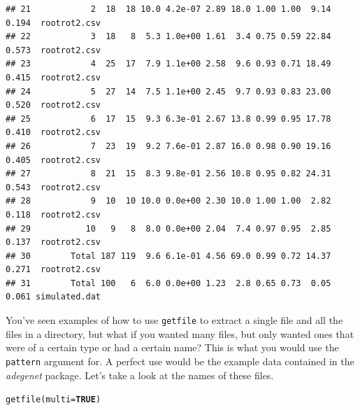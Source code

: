 \documentclass[letterpaper]{article}\usepackage[]{graphicx}\usepackage[]{color}
\makeatletter
\newcommand{\hlnum}[1]{\textcolor[rgb]{0.502,0,0.502}{\textbf{#1}}}%
\newcommand{\hlstd}[1]{\textcolor[rgb]{0,0,0}{#1}}%
\newcommand{\hlkwc}[1]{\textcolor[rgb]{0,0.502,0.753}{#1}}%
\newcommand{\hlkwd}[1]{\textcolor[rgb]{0,0.267,0.4}{#1}}%
\newenvironment{kframe}{%
 \def\at@end@of@kframe{}%
 \ifinner\ifhmode%
  \def\at@end@of@kframe{\end{minipage}}%
  \begin{minipage}{\columnwidth}%
 \fi\fi%
 \def\FrameCommand##1{\hskip\@totalleftmargin \hskip-\fboxsep
 \colorbox{shadecolor}{##1}\hskip-\fboxsep
     \hskip-\linewidth \hskip-\@totalleftmargin \hskip\columnwidth}%
 \MakeFramed {\advance\hsize-\width
   \@totalleftmargin\z@ \linewidth\hsize
   \@setminipage}}%
 {\par\unskip\endMakeFramed%
 \at@end@of@kframe}
\newenvironment{knitrout}{}{} %
\newcommand{\adegenet}{\textit{adegenet}}
\makeatother
\begin{document}
\begin{knitrout}
\begin{kframe}
\begin{verbatim}
## 21            2  18  18 10.0 4.2e-07 2.89 18.0 1.00 1.00  9.14 0.194  rootrot2.csv
## 22            3  18   8  5.3 1.0e+00 1.61  3.4 0.75 0.59 22.84 0.573  rootrot2.csv
## 23            4  25  17  7.9 1.1e+00 2.58  9.6 0.93 0.71 18.49 0.415  rootrot2.csv
## 24            5  27  14  7.5 1.1e+00 2.45  9.7 0.93 0.83 23.00 0.520  rootrot2.csv
## 25            6  17  15  9.3 6.3e-01 2.67 13.8 0.99 0.95 17.78 0.410  rootrot2.csv
## 26            7  23  19  9.2 7.6e-01 2.87 16.0 0.98 0.90 19.16 0.405  rootrot2.csv
## 27            8  21  15  8.3 9.8e-01 2.56 10.8 0.95 0.82 24.31 0.543  rootrot2.csv
## 28            9  10  10 10.0 0.0e+00 2.30 10.0 1.00 1.00  2.82 0.118  rootrot2.csv
## 29           10   9   8  8.0 0.0e+00 2.04  7.4 0.97 0.95  2.85 0.137  rootrot2.csv
## 30        Total 187 119  9.6 6.1e-01 4.56 69.0 0.99 0.72 14.37 0.271  rootrot2.csv
## 31        Total 100   6  6.0 0.0e+00 1.23  2.8 0.65 0.73  0.05 0.061 simulated.dat
\end{verbatim}
\end{kframe}
\end{knitrout}


You've seen examples of how to use \texttt{getfile} to extract a single file and all the files in a directory, but what if you wanted many files, but only wanted ones that were of a certain type or had a certain name? This is what you would use the \texttt{pattern} argument for.
A perfect use would be the example data contained in the \adegenet{} package. Let's take a look at the names of these files.
\begin{center}
\end{center}
\begin{knitrout}\footnotesize
{}\color{fgcolor}\begin{kframe}
\begin{alltt}
\hlkwd{getfile}\hlstd{(}\hlkwc{multi} \hlstd{=} \hlnum{TRUE}\hlstd{)}
\end{alltt}
\end{kframe}
\end{knitrout}
\end{document}
